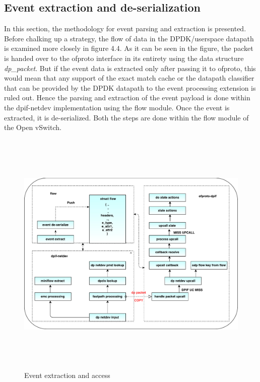 \subsection{Event extraction and de-serialization}
In this section, the methodology for event parsing and extraction is presented. Before chalking up a strategy, the flow of data in the DPDK/userspace datapath is examined more closely in figure 4.4. As it can be seen in the figure, the packet is handed over to the ofproto interface in its entirety using the data structure \textit{dp_packet}. But if the event data is extracted only after passing it to ofproto, this would mean that any support of the exact match cache or the datapath classifier that can be provided by the DPDK datapath to the event processing extension is ruled out. Hence the parsing and extraction of the event payload is done within the dpif-netdev implementation using the flow module. Once the event is extracted, it is de-serialized. Both the steps are done within the flow module of the Open vSwitch. 

\begin{figure}[H]
 \centering
 \caption{Event extraction and access}
 \includegraphics[height=12cm]{flowextract01.pdf}
\end{figure}

